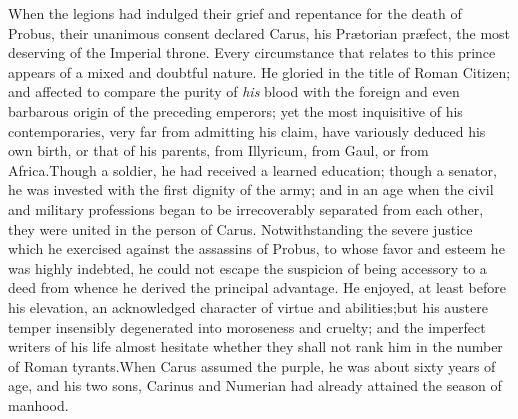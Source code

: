 When the legions had indulged their grief and repentance for the
death of Probus, their unanimous consent declared Carus, his
Prætorian præfect, the most deserving of the Imperial throne.
Every circumstance that relates to this prince appears of a mixed
and doubtful nature. He gloried in the title of Roman Citizen;
and affected to compare the purity of \textit{his} blood with the
foreign and even barbarous origin of the preceding emperors; yet
the most inquisitive of his contemporaries, very far from
admitting his claim, have variously deduced his own birth, or
that of his parents, from Illyricum, from Gaul, or from Africa.\footnotemark[64]
Though a soldier, he had received a learned education; though
a senator, he was invested with the first dignity of the army;
and in an age when the civil and military professions began to be
irrecoverably separated from each other, they were united in the
person of Carus. Notwithstanding the severe justice which he
exercised against the assassins of Probus, to whose favor and
esteem he was highly indebted, he could not escape the suspicion
of being accessory to a deed from whence he derived the principal
advantage. He enjoyed, at least before his elevation, an
acknowledged character of virtue and abilities;\footnotemark[65] but his
austere temper insensibly degenerated into moroseness and
cruelty; and the imperfect writers of his life almost hesitate
whether they shall not rank him in the number of Roman tyrants.\footnotemark[66]
When Carus assumed the purple, he was about sixty years of
age, and his two sons, Carinus and Numerian had already attained
the season of manhood.\footnotemark[67]





